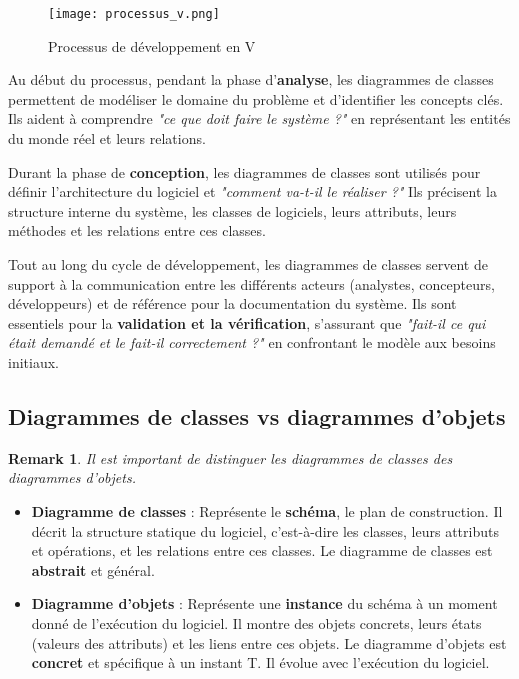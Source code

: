 \documentclass{article}
\newtheorem{remark}{Remark}
\begin{document}
\begin{figure}[h]
    \centering
    \texttt{[image: processus\_v.png]}
    \caption{Processus de développement en V}
    \label{fig:processus_v}
\end{figure}

Au début du processus, pendant la phase d'\textbf{analyse}, les diagrammes de classes permettent de modéliser le domaine du problème et d'identifier les concepts clés. Ils aident à comprendre \textit{"ce que doit faire le système ?"} en représentant les entités du monde réel et leurs relations.

Durant la phase de \textbf{conception}, les diagrammes de classes sont utilisés pour définir l'architecture du logiciel et \textit{"comment va-t-il le réaliser ?"} Ils précisent la structure interne du système, les classes de logiciels, leurs attributs, leurs méthodes et les relations entre ces classes.

Tout au long du cycle de développement, les diagrammes de classes servent de support à la communication entre les différents acteurs (analystes, concepteurs, développeurs) et de référence pour la documentation du système. Ils sont essentiels pour la \textbf{validation et la vérification}, s'assurant que \textit{"fait-il ce qui était demandé et le fait-il correctement ?"} en confrontant le modèle aux besoins initiaux.

\subsection{Diagrammes de classes vs diagrammes d'objets}

\begin{remark}
Il est important de distinguer les diagrammes de classes des diagrammes d'objets.
\end{remark}

\begin{itemize}
    \item \textbf{Diagramme de classes} : Représente le \textbf{schéma}, le plan de construction. Il décrit la structure statique du logiciel, c'est-à-dire les classes, leurs attributs et opérations, et les relations entre ces classes. Le diagramme de classes est \textbf{abstrait} et général.
    \item \textbf{Diagramme d'objets} : Représente une \textbf{instance} du schéma à un moment donné de l'exécution du logiciel. Il montre des objets concrets, leurs états (valeurs des attributs) et les liens entre ces objets. Le diagramme d'objets est \textbf{concret} et spécifique à un instant T. Il évolue avec l'exécution du logiciel.
\end{itemize}
\end{document}
